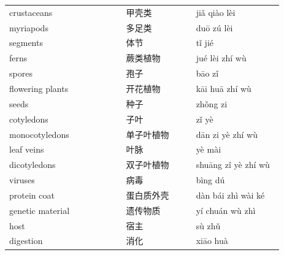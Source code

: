 \documentclass[11pt]{article}
\begin{document}
\begin{longtable}{@{}p{0.40\linewidth}p{0.24\linewidth}p{0.30\linewidth}@{}}
crustaceans & 甲壳类 & jiǎ qiào lèi \\
myriapods & 多足类 & duō zú lèi \\
segments & 体节 & tǐ jié \\
ferns & 蕨类植物 & jué lèi zhí wù \\
spores & 孢子 & bāo zǐ \\
flowering plants & 开花植物 & kāi huā zhí wù \\
seeds & 种子 & zhǒng zi \\
cotyledons & 子叶 & zǐ yè \\
monocotyledons & 单子叶植物 & dān zi yè zhí wù \\
leaf veins & 叶脉 & yè mài \\
dicotyledons & 双子叶植物 & shuāng zǐ yè zhí wù \\
viruses & 病毒 & bìng dú \\
protein coat & 蛋白质外壳 & dàn bái zhì wài ké \\
genetic material & 遗传物质 & yí chuán wù zhì \\
host & 宿主 & sù zhǔ \\
digestion & 消化 & xiāo huà \\
\end{longtable}
\end{document}
